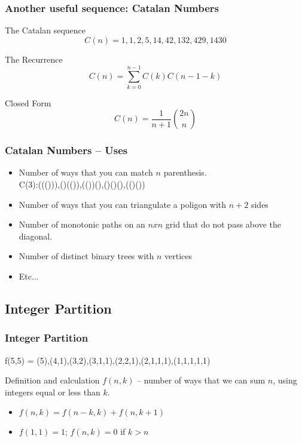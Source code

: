 \documentclass{beamer}
\begin{document}
\begin{frame}
  \frametitle{Another useful sequence: Catalan Numbers}
  {\smaller
  \begin{block}{The Catalan sequence}
    \begin{equation*}
      C(n) = 1, 1, 2, 5, 14, 42, 132, 429, 1430
    \end{equation*}
  \end{block}

  \begin{exampleblock}{The Recurrence}
    \begin{equation*}
    C(n) = \sum^{n-1}_{k=0}C(k)C(n-1-k)
    \end{equation*}
  \end{exampleblock}

  \begin{exampleblock}{Closed Form}
    \begin{equation*}
      C(n) = \frac{1}{n+1}\binom{2n}{n}
    \end{equation*}
  \end{exampleblock}
  }
\end{frame}

\begin{frame}
  \frametitle{Catalan Numbers -- Uses}
  \begin{itemize}
    \item Number of ways that you can match $n$ parenthesis.\\
      C(3):((())),()(()),(())(),()()(),(()())

      \medskip

    \item Number of ways that you can triangulate a poligon with $n+2$ sides
    \item Number of monotonic paths on an $nxn$ grid that do not pass above
      the diagonal.
    \item Number of distinct binary trees with $n$ vertices
    \item Etc...
  \end{itemize}
\end{frame}

\subsection{Integer Partition}
\begin{frame}
  \frametitle{Integer Partition}
  \begin{block}{}
    f(5,5) = (5),(4,1),(3,2),(3,1,1),(2,2,1),(2,1,1,1),(1,1,1,1,1)
  \end{block}
  \begin{block}{Definition and calculation}
    $f(n,k)$ -- number of ways that we can sum $n$, using integers
    equal or less than $k$.

    \bigskip

    \begin{itemize}
    \item $f(n,k) = f(n-k,k) + f(n, k+1)$
    \item $f(1,1) = 1$; $f(n,k) = 0$ if $k > n$
    \end{itemize}
  \end{block}
\end{frame}
\end{document}
